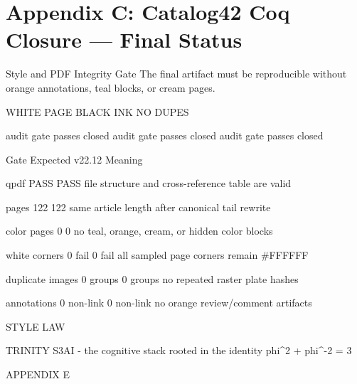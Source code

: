 
\section{Appendix C: Catalog42 Coq Closure --- Final Status}

Style and PDF Integrity Gate
        The final artifact must be reproducible without orange annotations, teal blocks, or cream
                                                  pages.

                      WHITE PAGE                              BLACK INK                                  NO DUPES

                 audit gate passes closed                  audit gate passes closed                 audit gate passes closed

               Gate                          Expected                      v22.12                                 Meaning

 qpdf                               PASS                        PASS                        file structure and cross-reference table are valid

 pages                              122                         122                         same article length after canonical tail rewrite

 color pages                        0                           0                           no teal, orange, cream, or hidden color blocks

 white corners                      0 fail                      0 fail                      all sampled page corners remain \#FFFFFF

 duplicate images                   0 groups                    0 groups                    no repeated raster plate hashes

 annotations                        0 non-link                  0 non-link                  no orange review/comment artifacts

  STYLE LAW

                                TRINITY S3AI - the cognitive stack rooted in the identity phi\textasciicircum{}2 + phi\textasciicircum{}-2 = 3

                                                                     APPENDIX E